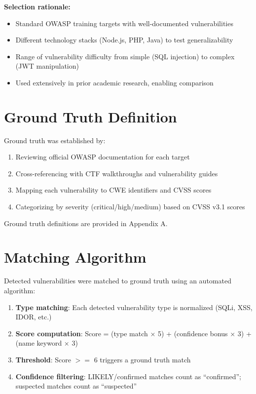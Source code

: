 \documentclass[12pt,a4paper,oneside]{book}
\begin{document}
\textbf{Selection rationale:}
\begin{itemize}
    \item Standard OWASP training targets with well-documented vulnerabilities
    \item Different technology stacks (Node.js, PHP, Java) to test generalizability
    \item Range of vulnerability difficulty from simple (SQL injection) to complex (JWT manipulation)
    \item Used extensively in prior academic research, enabling comparison
\end{itemize}

\section{Ground Truth Definition}

Ground truth was established by:
\begin{enumerate}
    \item Reviewing official OWASP documentation for each target
    \item Cross-referencing with CTF walkthroughs and vulnerability guides
    \item Mapping each vulnerability to CWE identifiers and CVSS scores
    \item Categorizing by severity (critical/high/medium) based on CVSS v3.1 scores
\end{enumerate}

Ground truth definitions are provided in Appendix A.

\section{Matching Algorithm}

Detected vulnerabilities were matched to ground truth using an automated algorithm:

\begin{enumerate}
    \item \textbf{Type matching}: Each detected vulnerability type is normalized (SQLi, XSS, IDOR, etc.)
    \item \textbf{Score computation}: Score = (type match × 5) + (confidence bonus × 3) + (name keyword × 3)
    \item \textbf{Threshold}: Score $>=$ 6 triggers a ground truth match
    \item \textbf{Confidence filtering}: LIKELY/confirmed matches count as ``confirmed''; suspected matches count as ``suspected''
\end{enumerate}
\end{document}
